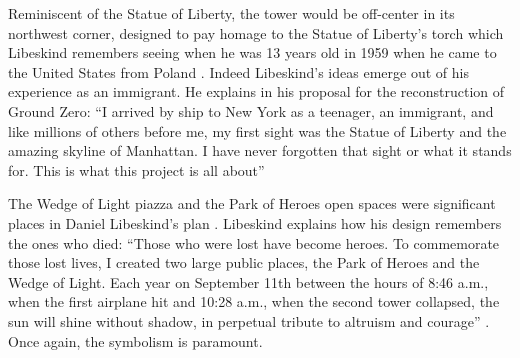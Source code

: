 Reminiscent of the
Statue of Liberty, the tower would be off-center in its northwest
corner, designed to pay homage to the Statue of Liberty’s torch which
Libeskind remembers seeing when he was 13 years old in 1959 when he
came to the United States from Poland \citep{swanson2011}.  Indeed Libeskind’s
ideas emerge out of his experience as an immigrant.  He explains in his
proposal for the reconstruction of Ground Zero: ``I
arrived by ship to New York as a teenager, an immigrant, and like
millions of others before me, my first sight was the Statue of Liberty
and the amazing skyline of Manhattan.  I have never forgotten that
sight or what it stands for.  This is what this project is all about'' \citep{libeskind2012}

The Wedge of Light piazza and the Park of Heroes open spaces were
significant places in Daniel Libeskind's plan
\citep{manhattan2003}.  Libeskind explains how his design
remembers the ones who died: “Those who were lost
have become heroes.  To commemorate those lost lives, I created two
large public places, the Park of Heroes and the Wedge of Light.  Each
year on September 11th between the hours of 8:46 a.m., when the first
airplane hit and 10:28 a.m., when the second tower collapsed, the sun
will shine without shadow, in perpetual tribute to altruism and
courage” \citep{libeskind2012}.  Once again, the symbolism
is paramount.  


